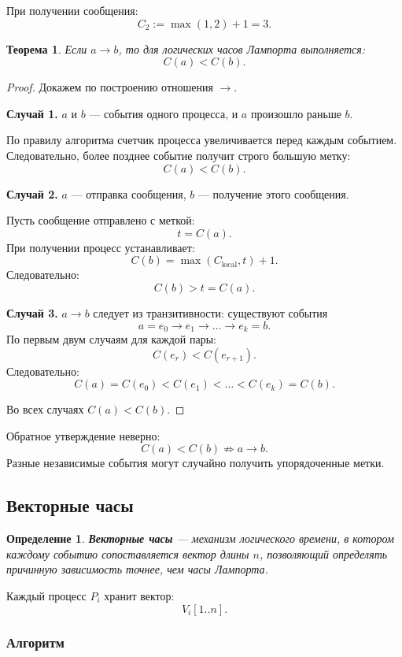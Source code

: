 \documentclass[12pt,a4paper]{article}
\newtheorem{definition}{Определение}
\newtheorem{theorem}{Теорема}
\begin{document}
При получении сообщения:
\[
C_2 := \max(1,2)+1 = 3.
\]

\begin{theorem}
Если $a \rightarrow b$, то для логических часов Лампорта выполняется:
\[
C(a) < C(b).
\]
\end{theorem}

\begin{proof}
Докажем по построению отношения $\rightarrow$.

\textbf{Случай 1.} $a$ и $b$ --- события одного процесса, и $a$ произошло раньше $b$.

По правилу алгоритма счетчик процесса увеличивается перед каждым событием. Следовательно, более позднее событие получит строго большую метку:
\[
C(a) < C(b).
\]

\textbf{Случай 2.} $a$ --- отправка сообщения, $b$ --- получение этого сообщения.

Пусть сообщение отправлено с меткой:
\[
t = C(a).
\]
При получении процесс устанавливает:
\[
C(b) = \max(C_{\text{local}}, t) + 1.
\]
Следовательно:
\[
C(b) > t = C(a).
\]

\textbf{Случай 3.} $a \rightarrow b$ следует из транзитивности: существуют события
\[
a = e_0 \rightarrow e_1 \rightarrow \dots \rightarrow e_k = b.
\]
По первым двум случаям для каждой пары:
\[
C(e_r) < C(e_{r+1}).
\]
Следовательно:
\[
C(a) = C(e_0) < C(e_1) < \dots < C(e_k) = C(b).
\]

Во всех случаях $C(a) < C(b)$.
\end{proof}

Обратное утверждение неверно:
\[
C(a) < C(b) \not\Rightarrow a \rightarrow b.
\]
Разные независимые события могут случайно получить упорядоченные метки.

\subsection{Векторные часы}

\begin{definition}
\textbf{Векторные часы} --- механизм логического времени, в котором каждому событию сопоставляется вектор длины $n$, позволяющий определять причинную зависимость точнее, чем часы Лампорта.
\end{definition}

Каждый процесс $P_i$ хранит вектор:
\[
V_i[1..n].
\]

\subsubsection{Алгоритм}
\end{document}
